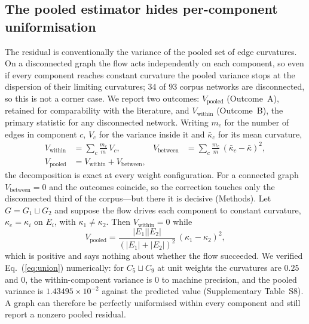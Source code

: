 \documentclass[11pt]{article}
\begin{document}
\subsection*{The pooled estimator hides per-component uniformisation}

The residual is conventionally the variance of the pooled set of edge
curvatures. On a disconnected graph the flow acts independently on each
component, so even if every component reaches constant curvature the pooled
variance stops at the dispersion of their limiting curvatures; $34$ of $93$
corpus networks are disconnected, so this is not a corner case. We report two
outcomes: $V_{\mathrm{pooled}}$ (Outcome~A), retained for comparability with
the literature, and $V_{\mathrm{within}}$ (Outcome~B), the primary statistic
for any disconnected network. Writing $m_c$ for the number of edges in
component $c$, $V_c$ for the variance inside it and $\bar\kappa_c$ for its mean
curvature,
\begin{align}
  V_{\mathrm{within}} &= \sum_c \frac{m_c}{m}\,V_c, &
  V_{\mathrm{between}} &= \sum_c \frac{m_c}{m}\,(\bar\kappa_c-\bar\kappa)^2,
  \label{eq:decomp}\\
  V_{\mathrm{pooled}} &= V_{\mathrm{within}} + V_{\mathrm{between}},
  \nonumber
\end{align}
the decomposition is exact at every weight configuration. For a connected graph
$V_{\mathrm{between}}=0$ and the outcomes coincide, so the correction touches
only the disconnected third of the corpus---but there it is decisive
(Methods). Let
$G=G_1\sqcup G_2$ and suppose the flow drives each component to constant
curvature, $\kappa_e=\kappa_i$ on $E_i$, with $\kappa_1\neq\kappa_2$. Then
$V_{\mathrm{within}}=0$ while
\begin{equation}
  V_{\mathrm{pooled}}=\frac{|E_1||E_2|}{(|E_1|+|E_2|)^2}\,(\kappa_1-\kappa_2)^2,
  \label{eq:union}
\end{equation}
which is positive and says nothing about whether the flow succeeded. We verified
Eq.~(\ref{eq:union}) numerically: for $C_5\sqcup C_9$ at unit weights the
curvatures are $0.25$ and $0$, the within-component variance is $0$ to
machine precision, and the pooled variance is $1.43495\times10^{-2}$ against the
predicted value (Supplementary Table~S8).
A graph can therefore be perfectly uniformised within every component and still
report a nonzero pooled residual.
\end{document}
